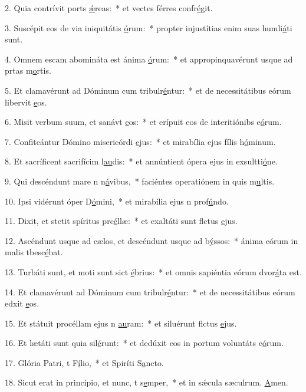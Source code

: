2. Quia contrívit ports \uline{ǽ}reas:~* et vectes férres confr\uline{é}git.\par 
3. Suscépit eos de via iniquitátis \uline{ó}rum:~* propter injustítias enim suas humli\uline{á}ti sunt.\par 
4. Omnem escam abomináta est ánima \uline{ó}rum:~* et appropinquavérunt usque ad prtas m\uline{o}rtis.\par 
5. Et clamavérunt ad Dóminum cum tribulr\uline{é}ntur:~* et de necessitátibus eórum libervit \uline{e}os.\par 
6. Misit verbum suum, et sanávt \uline{e}os:~* et erípuit eos de interitiónibs e\uline{ó}rum.\par 
7. Confiteántur Dómino misericórdi \uline{e}jus:~* et mirabília ejus fílis h\uline{ó}minum.\par 
8. Et sacríficent sacrifícim l\uline{au}dis:~* et annúntient ópera ejus in exsultti\uline{ó}ne.\par 
9. Qui descéndunt mare n n\uline{á}vibus,~* faciéntes operatiónem in quis m\uline{u}ltis.\par 
10. Ipsi vidérunt óper D\uline{ó}mini,~* et mirabília ejus n prof\uline{ú}ndo.\par 
11. Dixit, et stetit spíritus prc\uline{é}llæ:~* et exaltáti sunt flctus \uline{e}jus.\par 
12. Ascéndunt usque ad cælos, et descéndunt usque ad b\uline{ý}ssos:~* ánima eórum in malis tbesc\uline{é}bat.\par 
13. Turbáti sunt, et moti sunt sict \uline{é}brius:~* et omnis sapiéntia eórum dvor\uline{á}ta est.\par 
14. Et clamavérunt ad Dóminum cum tribulr\uline{é}ntur:~* et de necessitátibus eórum edxit \uline{e}os.\par 
15. Et státuit procéllam ejus n \uline{au}ram:~* et siluérunt flctus \uline{e}jus.\par 
16. Et lætáti sunt quia sil\uline{é}runt:~* et dedúxit eos in portum voluntáts e\uline{ó}rum.\par 
17. Glória Patri, t F\uline{í}lio,~* et Spiríti S\uline{a}ncto.\par 
18. Sicut erat in princípio, et nunc, t s\uline{e}mper,~* et in sǽcula sæculrum. \uline{A}men.\par 
